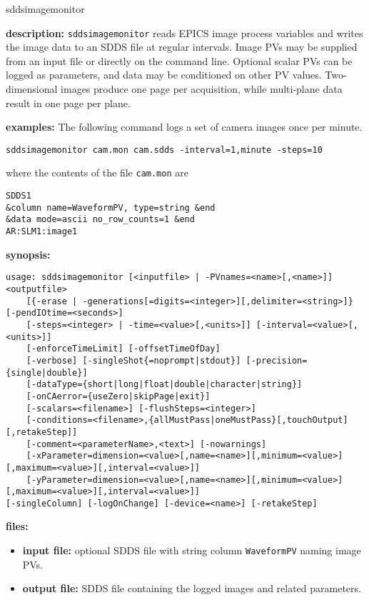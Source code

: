 %
\begin{sddsprog}{sddsimagemonitor}
\item \textbf{description:}
\verb+sddsimagemonitor+ reads EPICS image process variables and writes the image
  data to an SDDS file at regular intervals. Image PVs may be supplied from an
  input file or directly on the command line. Optional scalar PVs can be logged as
  parameters, and data may be conditioned on other PV values. Two-dimensional
  images produce one page per acquisition, while multi-plane data result in one
  page per plane.
\item \textbf{examples:}
The following command logs a set of camera images once per minute.
\begin{verbatim}
sddsimagemonitor cam.mon cam.sdds -interval=1,minute -steps=10
\end{verbatim}
where the contents of the file \verb+cam.mon+ are
\begin{verbatim}
SDDS1
&column name=WaveformPV, type=string &end
&data mode=ascii no_row_counts=1 &end
AR:SLM1:image1
\end{verbatim}
\item \textbf{synopsis:}
\begin{verbatim}
usage: sddsimagemonitor [<inputfile> | -PVnames=<name>[,<name>]] <outputfile>
    [{-erase | -generations[=digits=<integer>][,delimiter=<string>]} [-pendIOtime=<seconds>]
    [-steps=<integer> | -time=<value>[,<units>]] [-interval=<value>[,<units>]]
    [-enforceTimeLimit] [-offsetTimeOfDay]
    [-verbose] [-singleShot{=noprompt|stdout}] [-precision={single|double}]
    [-dataType={short|long|float|double|character|string}]
    [-onCAerror={useZero|skipPage|exit}]
    [-scalars=<filename>] [-flushSteps=<integer>]
    [-conditions=<filename>,{allMustPass|oneMustPass}[,touchOutput][,retakeStep]]
    [-comment=<parameterName>,<text>] [-nowarnings]
    [-xParameter=dimension=<value>[,name=<name>][,minimum=<value>][,maximum=<value>][,interval=<value>]]
    [-yParameter=dimension=<value>[,name=<name>][,minimum=<value>][,maximum=<value>][,interval=<value>]]
[-singleColumn] [-logOnChange] [-device=<name>] [-retakeStep]
\end{verbatim}
\item \textbf{files:}
\begin{itemize}
  \item \textbf{input file:} optional SDDS file with string column \verb|WaveformPV| naming image PVs.
  \item \textbf{output file:} SDDS file containing the logged images and related parameters.
\end{itemize}


\end{sddsprog}
